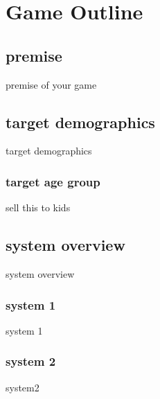 \chapter{Game Outline}
\section{premise}
premise of your game\\
\section{target demographics}
target demographics
\subsection{target age group}
sell this to kids
\section{system overview}
system overview
\subsection{system 1}
system 1
\subsection{system 2}
system2